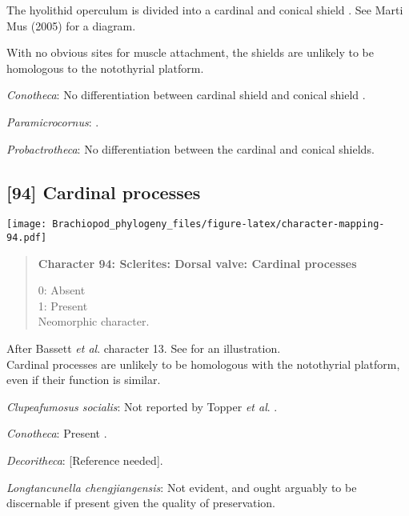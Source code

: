 \documentclass[openany]{book}
\theoremstyle{definition}
\theoremstyle{definition}
\theoremstyle{definition}
\theoremstyle{remark}
\begin{document}
The hyolithid operculum is divided into a cardinal and conical shield
\citep{Zhang2018Ahyolithid}. See Marti Mus (2005) for a diagram.

With no obvious sites for muscle attachment, the shields are unlikely to
be homologous to the notothyrial platform.

\hypertarget{Conotheca-coding-93}{}
\emph{Conotheca}: No differentiation between cardinal shield and conical
shield \citep{Wrona2003, Devaere2014}.

\hypertarget{Paramicrocornus-coding-93}{}
\emph{Paramicrocornus}: \citet{Zhang2018Ahyolithid}.

\hypertarget{Probactrotheca-coding-93}{}
\emph{Probactrotheca}: No differentiation between the cardinal and
conical shields.

\subsection*{{[}94{]} Cardinal processes}\label{cardinal-processes}

\texttt{[image: Brachiopod\_phylogeny\_files/figure-latex/character-mapping-94.pdf]}

\begin{quote}
\textbf{Character 94: Sclerites: Dorsal valve: Cardinal processes}

0: Absent\\
1: Present\\
Neomorphic character.
\end{quote}

After Bassett \emph{et al}.
\citeyearpar{Bassett2001Functionalmorphology} character 13. See
\citet{MartiMus2005} for an illustration.\\
Cardinal processes are unlikely to be homologous with the notothyrial
platform, even if their function is similar.

\hypertarget{Clupeafumosus_socialis-coding-94}{}
\emph{Clupeafumosus socialis}: Not reported by Topper \emph{et al}.
\citeyearpar{Topper2013Reappraisalof}.

\hypertarget{Conotheca-coding-94}{}
\emph{Conotheca}: Present \citep{Wrona2003}.

\hypertarget{Decoritheca-coding-94}{}
\emph{Decoritheca}: {[}Reference needed{]}.

\hypertarget{Longtancunella_chengjiangensis-coding-94}{}
\emph{Longtancunella chengjiangensis}: Not evident, and ought arguably
to be discernable if present given the quality of preservation.
\end{document}
